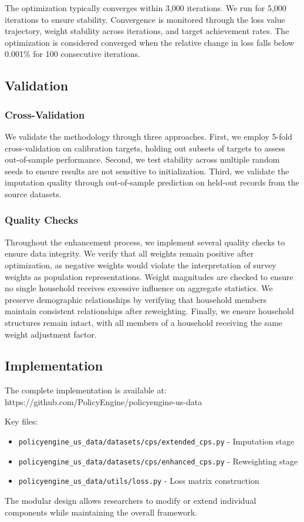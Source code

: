 The optimization typically converges within 3,000 iterations. We run for 5,000 iterations to ensure stability. Convergence is monitored through the loss value trajectory, weight stability across iterations, and target achievement rates. The optimization is considered converged when the relative change in loss falls below 0.001\% for 100 consecutive iterations.

\subsection{Validation}

\subsubsection{Cross-Validation}

We validate the methodology through three approaches. First, we employ 5-fold cross-validation on calibration targets, holding out subsets of targets to assess out-of-sample performance. Second, we test stability across multiple random seeds to ensure results are not sensitive to initialization. Third, we validate the imputation quality through out-of-sample prediction on held-out records from the source datasets.

\subsubsection{Quality Checks}

Throughout the enhancement process, we implement several quality checks to ensure data integrity. We verify that all weights remain positive after optimization, as negative weights would violate the interpretation of survey weights as population representations. Weight magnitudes are checked to ensure no single household receives excessive influence on aggregate statistics. We preserve demographic relationships by verifying that household members maintain consistent relationships after reweighting. Finally, we ensure household structures remain intact, with all members of a household receiving the same weight adjustment factor.

\subsection{Implementation}

The complete implementation is available at:
https://github.com/PolicyEngine/policyengine-us-data

Key files:
\begin{itemize}
\item \texttt{policyengine\_us\_data/datasets/cps/extended\_cps.py} - Imputation stage
\item \texttt{policyengine\_us\_data/datasets/cps/enhanced\_cps.py} - Reweighting stage
\item \texttt{policyengine\_us\_data/utils/loss.py} - Loss matrix construction
\end{itemize}

The modular design allows researchers to modify or extend individual components while maintaining the overall framework.